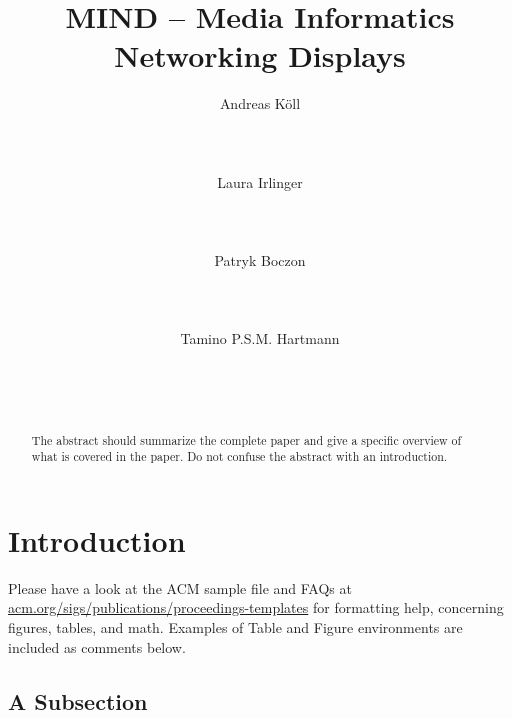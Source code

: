 \documentclass{acm_proc_article-sp}
\begin{document}
\title{MIND – Media Informatics Networking Displays}

\author{
\alignauthor
Andreas Köll\\
       \\
       \\
       \\
\alignauthor
Laura Irlinger\\
       \\
       \\
       \\
\alignauthor
Patryk Boczon\\
       \\
       \\
       \\
\alignauthor
Tamino P.S.M. Hartmann\\
       \\
       \\
       \\
}

\maketitle
\begin{abstract}
The abstract should summarize the complete paper and give a specific overview of what is covered in the paper. Do not confuse the abstract with an introduction.
\end{abstract}

\section{Introduction}
Please have a look at the ACM sample file and FAQs at \url{acm.org/sigs/publications/proceedings-templates} for formatting help, concerning figures, tables, and math. Examples of Table and Figure environments are included as comments below.

\subsection{A Subsection}
\end{document}
